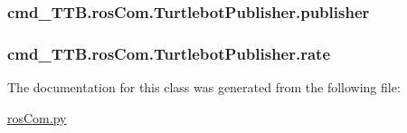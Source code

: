 \subsubsection[{\texorpdfstring{publisher}{publisher}}]{\setlength{\rightskip}{0pt plus 5cm}cmd\+\_\+\+T\+T\+B.\+ros\+Com.\+Turtlebot\+Publisher.\+publisher}\hypertarget{classcmd__TTB_1_1rosCom_1_1TurtlebotPublisher_a14ff1a896341077ba1a89e7411078e0f}{}\label{classcmd__TTB_1_1rosCom_1_1TurtlebotPublisher_a14ff1a896341077ba1a89e7411078e0f}
\subsubsection[{\texorpdfstring{rate}{rate}}]{\setlength{\rightskip}{0pt plus 5cm}cmd\+\_\+\+T\+T\+B.\+ros\+Com.\+Turtlebot\+Publisher.\+rate}\hypertarget{classcmd__TTB_1_1rosCom_1_1TurtlebotPublisher_a98cdf1c16a60872288eb9acc94be2873}{}\label{classcmd__TTB_1_1rosCom_1_1TurtlebotPublisher_a98cdf1c16a60872288eb9acc94be2873}


The documentation for this class was generated from the following file\+:\begin{DoxyCompactItemize}
\item 
\hyperlink{rosCom_8py}{ros\+Com.\+py}\end{DoxyCompactItemize}
